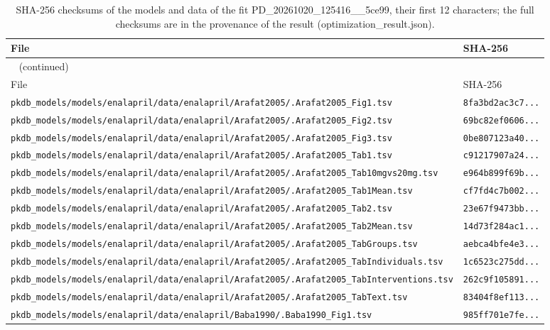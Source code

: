 \begin{longtable}{ll}
\caption{SHA-256 checksums of the models and data of the fit PD\_20261020\_125416\_\_5ce99, their first 12 characters; the full checksums are in the provenance of the result (optimization\_result.json).}\label{tab:checksums:PD_20261020_125416__5ce99} \\
\toprule
File & SHA-256 \\
\midrule
\endfirsthead
\multicolumn{2}{l}{\small\tablename~\thetable{} (continued)} \\
\toprule
File & SHA-256 \\
\midrule
\endhead
\bottomrule
\endlastfoot
\texttt{pkdb\_models/models/enalapril/data/enalapril/Arafat2005/.Arafat2005\_Fig1.tsv} & \texttt{8fa3bd2ac3c7...} \\
\texttt{pkdb\_models/models/enalapril/data/enalapril/Arafat2005/.Arafat2005\_Fig2.tsv} & \texttt{69bc82ef0606...} \\
\texttt{pkdb\_models/models/enalapril/data/enalapril/Arafat2005/.Arafat2005\_Fig3.tsv} & \texttt{0be807123a40...} \\
\texttt{pkdb\_models/models/enalapril/data/enalapril/Arafat2005/.Arafat2005\_Tab1.tsv} & \texttt{c91217907a24...} \\
\texttt{pkdb\_models/models/enalapril/data/enalapril/Arafat2005/.Arafat2005\_Tab10mgvs20mg.tsv} & \texttt{e964b899f69b...} \\
\texttt{pkdb\_models/models/enalapril/data/enalapril/Arafat2005/.Arafat2005\_Tab1Mean.tsv} & \texttt{cf7fd4c7b002...} \\
\texttt{pkdb\_models/models/enalapril/data/enalapril/Arafat2005/.Arafat2005\_Tab2.tsv} & \texttt{23e67f9473bb...} \\
\texttt{pkdb\_models/models/enalapril/data/enalapril/Arafat2005/.Arafat2005\_Tab2Mean.tsv} & \texttt{14d73f284ac1...} \\
\texttt{pkdb\_models/models/enalapril/data/enalapril/Arafat2005/.Arafat2005\_TabGroups.tsv} & \texttt{aebca4bfe4e3...} \\
\texttt{pkdb\_models/models/enalapril/data/enalapril/Arafat2005/.Arafat2005\_TabIndividuals.tsv} & \texttt{1c6523c275dd...} \\
\texttt{pkdb\_models/models/enalapril/data/enalapril/Arafat2005/.Arafat2005\_TabInterventions.tsv} & \texttt{262c9f105891...} \\
\texttt{pkdb\_models/models/enalapril/data/enalapril/Arafat2005/.Arafat2005\_TabText.tsv} & \texttt{83404f8ef113...} \\
\texttt{pkdb\_models/models/enalapril/data/enalapril/Baba1990/.Baba1990\_Fig1.tsv} & \texttt{985ff701e7fe...} \\

\end{longtable}
